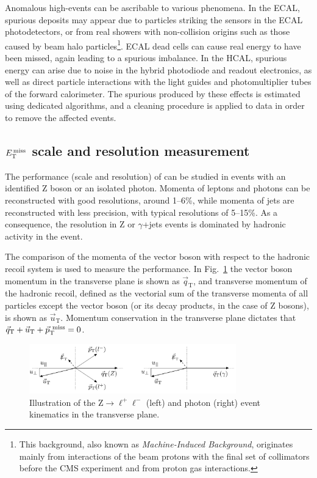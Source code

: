 Anomalous high-\MET events can be ascribable to various phenomena. In the ECAL, spurious deposits may appear due to particles striking the sensors in the ECAL photodetectors, or from real showers with non-collision origins such as those caused by beam halo particles\footnote{This background, also known as \emph{Machine-Induced Background}, originates mainly from interactions of the beam protons with the final set of collimators before the CMS experiment and from proton gas interactions.}. ECAL dead cells can cause real energy to have been missed, again leading to a spurious imbalance. In the HCAL, spurious energy can arise due to noise in the hybrid photodiode and readout electronics, as well as direct particle interactions with the light guides and photomultiplier tubes of the forward calorimeter. The spurious \MET produced by these effects is estimated using dedicated algorithms, and a cleaning procedure is applied to data in order to remove the affected events.

\subsection[\MET scale and resolution measurement]{\boldmath$E_\mathrm{T}^\mathrm{\,miss}$ scale and resolution measurement}
The performance (scale and resolution) of \MET can be studied in events with an identified Z boson or an isolated photon. Momenta of leptons and photons can be reconstructed with good resolutions, around 1--6\%, while momenta of jets are reconstructed with less precision, with typical resolutions of 5--15\%. As a consequence, the \MET resolution in Z or $\gamma$+jets events is dominated by hadronic activity in the event.

The comparison of the momenta of the vector boson with respect to the hadronic recoil system is used to measure the \MET performance. In Fig.~\ref{fig:metZgamma} the vector boson momentum in the transverse plane is shown as $\vec{q}_\mathrm{T}$, and transverse momentum of the hadronic recoil, defined as the vectorial sum of the transverse momenta of all particles except the vector boson (or its decay products, in the
case of Z bosons), is shown as $\vec{u}_\mathrm{T}$. Momentum conservation in the transverse plane dictates that $\vec{q}_\mathrm{T} + \vec{u}_\mathrm{T} + \vec{p}_\mathrm{T}^\mathrm{~miss} = 0$.

\begin{figure}[htb]
\centering
\includegraphics[width=0.8\textwidth]{images/metZgamma.pdf}
\caption{Illustration of the Z$\to\ell^+\ell^-$ (left) and photon (right) event kinematics in the transverse plane.}\label{fig:metZgamma}
\end{figure}

